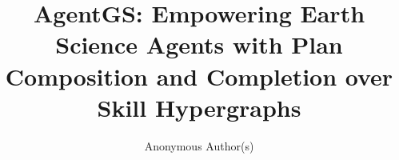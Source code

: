 \documentclass[sigconf,anonymous]{aamas}
\title[AgentGS]{AgentGS: Empowering Earth Science Agents with Plan Composition and Completion over Skill Hypergraphs}
\author{Anonymous Author(s)}
\begin{document}
\maketitle




\clearpage

\clearpage


\clearpage




\FloatBarrier
\clearpage

\balance


\clearpage
\nobalance
\appendix

\FloatBarrier
\end{document}
